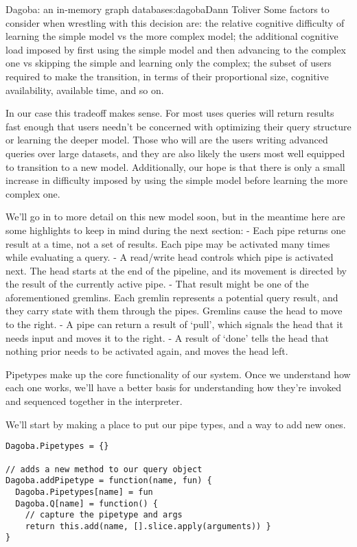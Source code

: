 \begin{aosachapter}{Dagoba: an in-memory graph database}{s:dagoba}{Dann Toliver}
Some factors to consider when wrestling with this decision are: the
relative cognitive difficulty of learning the simple model vs the more
complex model; the additional cognitive load imposed by first using the
simple model and then advancing to the complex one vs skipping the
simple and learning only the complex; the subset of users required to
make the transition, in terms of their proportional size, cognitive
availability, available time, and so on.

In our case this tradeoff makes sense. For most uses queries will return
results fast enough that users needn't be concerned with optimizing
their query structure or learning the deeper model. Those who will are
the users writing advanced queries over large datasets, and they are
also likely the users most well equipped to transition to a new model.
Additionally, our hope is that there is only a small increase in
difficulty imposed by using the simple model before learning the more
complex one.

We'll go in to more detail on this new model soon, but in the meantime
here are some highlights to keep in mind during the next section: - Each
pipe returns one result at a time, not a set of results. Each pipe may
be activated many times while evaluating a query. - A read/write head
controls which pipe is activated next. The head starts at the end of the
pipeline, and its movement is directed by the result of the currently
active pipe. - That result might be one of the aforementioned gremlins.
Each gremlin represents a potential query result, and they carry state
with them through the pipes. Gremlins cause the head to move to the
right. - A pipe can return a result of `pull', which signals the head
that it needs input and moves it to the right. - A result of `done'
tells the head that nothing prior needs to be activated again, and moves
the head left.

\label{pipetypes}

Pipetypes make up the core functionality of our system. Once we
understand how each one works, we'll have a better basis for
understanding how they're invoked and sequenced together in the
interpreter.

We'll start by making a place to put our pipe types, and a way to add
new ones.

\begin{verbatim}
Dagoba.Pipetypes = {}                                   

// adds a new method to our query object
Dagoba.addPipetype = function(name, fun) {              
  Dagoba.Pipetypes[name] = fun
  Dagoba.Q[name] = function() {
    // capture the pipetype and args
    return this.add(name, [].slice.apply(arguments)) }  
}
\end{verbatim}


\end{aosachapter}
